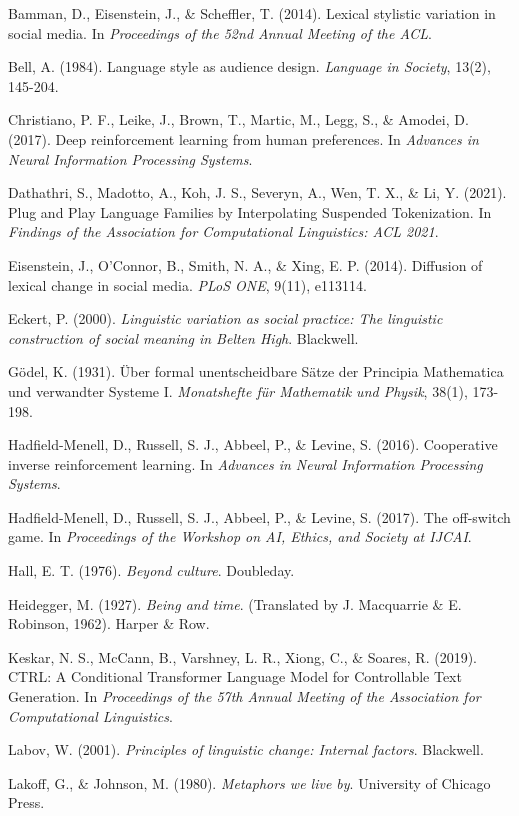 \documentclass[
]{article}
\begin{document}
Bamman, D., Eisenstein, J., \& Scheffler, T. (2014). Lexical stylistic
variation in social media. In \emph{Proceedings of the 52nd Annual
Meeting of the ACL}.

Bell, A. (1984). Language style as audience design. \emph{Language in
Society}, 13(2), 145-204.

Christiano, P. F., Leike, J., Brown, T., Martic, M., Legg, S., \&
Amodei, D. (2017). Deep reinforcement learning from human preferences.
In \emph{Advances in Neural Information Processing Systems}.

Dathathri, S., Madotto, A., Koh, J. S., Severyn, A., Wen, T. X., \& Li,
Y. (2021). Plug and Play Language Families by Interpolating Suspended
Tokenization. In \emph{Findings of the Association for Computational
Linguistics: ACL 2021}.

Eisenstein, J., O'Connor, B., Smith, N. A., \& Xing, E. P. (2014).
Diffusion of lexical change in social media. \emph{PLoS ONE}, 9(11),
e113114.

Eckert, P. (2000). \emph{Linguistic variation as social practice: The
linguistic construction of social meaning in Belten High}. Blackwell.

Gödel, K. (1931). Über formal unentscheidbare Sätze der Principia
Mathematica und verwandter Systeme I. \emph{Monatshefte für Mathematik
und Physik}, 38(1), 173-198.

Hadfield-Menell, D., Russell, S. J., Abbeel, P., \& Levine, S. (2016).
Cooperative inverse reinforcement learning. In \emph{Advances in Neural
Information Processing Systems}.

Hadfield-Menell, D., Russell, S. J., Abbeel, P., \& Levine, S. (2017).
The off-switch game. In \emph{Proceedings of the Workshop on AI, Ethics,
and Society at IJCAI}.

Hall, E. T. (1976). \emph{Beyond culture}. Doubleday.

Heidegger, M. (1927). \emph{Being and time}. (Translated by J.
Macquarrie \& E. Robinson, 1962). Harper \& Row.

Keskar, N. S., McCann, B., Varshney, L. R., Xiong, C., \& Soares, R.
(2019). CTRL: A Conditional Transformer Language Model for Controllable
Text Generation. In \emph{Proceedings of the 57th Annual Meeting of the
Association for Computational Linguistics}.

Labov, W. (2001). \emph{Principles of linguistic change: Internal
factors}. Blackwell.

Lakoff, G., \& Johnson, M. (1980). \emph{Metaphors we live by}.
University of Chicago Press.
\end{document}
